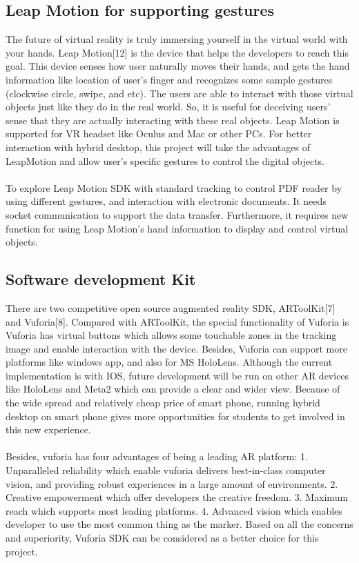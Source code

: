 \subsection{Leap Motion for supporting gestures}
The future of virtual reality is truly immersing yourself in the virtual world with your hands. Leap Motion[12] is the device that helps the developers to reach this goal. This device senses how user naturally moves their hands, and gets the hand information like location of user’s finger and recognizes some sample gestures (clockwise circle, swipe, and etc). The users are able to interact with those virtual objects just like they do in the real world. So, it is useful for deceiving users' sense that they are actually interacting with these real objects. Leap Motion is supported for VR headset like Oculus and Mac or other PCs. For better interaction with hybrid desktop, this project will take the advantages of LeapMotion and allow user’s specific gestures to control the digital objects.
\\
\\
To explore Leap Motion SDK with standard tracking to control PDF reader by using different gestures, and interaction with electronic documents. It needs socket communication to support the data transfer. Furthermore, it requires new function for using Leap Motion’s hand information to display and control virtual objects. 


\subsection{Software development Kit}
There are two competitive open source augmented reality SDK, ARToolKit[7] and Vuforia[8]. Compared with ARToolKit, the special functionality of Vuforia is Vuforia has virtual buttons which allows some touchable zones in the tracking image and enable interaction with the device. Besides, Vuforia can support more platforms like windows app, and also for MS HoloLens. Although the current implementation is with IOS, future development will be run on other AR devices like HoloLens and Meta2 which can provide a clear and wider view. Because of the wide spread and relatively cheap price of smart phone, running hybrid desktop on smart phone gives more opportunities for students to get involved in this new experience.
\\
\\
Besides, vuforia has four advantages of being a leading AR platform: 1. Unparalleled reliability which enable vuforia delivers best-in-class computer vision, and providing robust experiences in a large amount of environments. 2. Creative empowerment which offer developers the creative freedom. 3. Maximum reach which supports most leading platforms. 4. Advanced vision which enables developer to use the most common thing as the marker. Based on all the concerns and superiority, Vuforia SDK can be considered as a better choice for this project.

